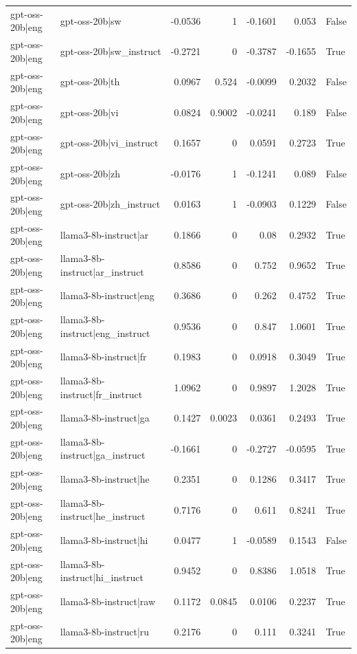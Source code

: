 \begin{table}
\begin{tabular}{l l r r r r l}
gpt-oss-20b|eng & gpt-oss-20b|sw & -0.0536 & 1 & -0.1601 & 0.053 & False \\
gpt-oss-20b|eng & gpt-oss-20b|sw_instruct & -0.2721 & 0 & -0.3787 & -0.1655 & True \\
gpt-oss-20b|eng & gpt-oss-20b|th & 0.0967 & 0.524 & -0.0099 & 0.2032 & False \\
gpt-oss-20b|eng & gpt-oss-20b|vi & 0.0824 & 0.9002 & -0.0241 & 0.189 & False \\
gpt-oss-20b|eng & gpt-oss-20b|vi_instruct & 0.1657 & 0 & 0.0591 & 0.2723 & True \\
gpt-oss-20b|eng & gpt-oss-20b|zh & -0.0176 & 1 & -0.1241 & 0.089 & False \\
gpt-oss-20b|eng & gpt-oss-20b|zh_instruct & 0.0163 & 1 & -0.0903 & 0.1229 & False \\
gpt-oss-20b|eng & llama3-8b-instruct|ar & 0.1866 & 0 & 0.08 & 0.2932 & True \\
gpt-oss-20b|eng & llama3-8b-instruct|ar_instruct & 0.8586 & 0 & 0.752 & 0.9652 & True \\
gpt-oss-20b|eng & llama3-8b-instruct|eng & 0.3686 & 0 & 0.262 & 0.4752 & True \\
gpt-oss-20b|eng & llama3-8b-instruct|eng_instruct & 0.9536 & 0 & 0.847 & 1.0601 & True \\
gpt-oss-20b|eng & llama3-8b-instruct|fr & 0.1983 & 0 & 0.0918 & 0.3049 & True \\
gpt-oss-20b|eng & llama3-8b-instruct|fr_instruct & 1.0962 & 0 & 0.9897 & 1.2028 & True \\
gpt-oss-20b|eng & llama3-8b-instruct|ga & 0.1427 & 0.0023 & 0.0361 & 0.2493 & True \\
gpt-oss-20b|eng & llama3-8b-instruct|ga_instruct & -0.1661 & 0 & -0.2727 & -0.0595 & True \\
gpt-oss-20b|eng & llama3-8b-instruct|he & 0.2351 & 0 & 0.1286 & 0.3417 & True \\
gpt-oss-20b|eng & llama3-8b-instruct|he_instruct & 0.7176 & 0 & 0.611 & 0.8241 & True \\
gpt-oss-20b|eng & llama3-8b-instruct|hi & 0.0477 & 1 & -0.0589 & 0.1543 & False \\
gpt-oss-20b|eng & llama3-8b-instruct|hi_instruct & 0.9452 & 0 & 0.8386 & 1.0518 & True \\
gpt-oss-20b|eng & llama3-8b-instruct|raw & 0.1172 & 0.0845 & 0.0106 & 0.2237 & True \\
gpt-oss-20b|eng & llama3-8b-instruct|ru & 0.2176 & 0 & 0.111 & 0.3241 & True \\

\end{tabular}
\end{table}

